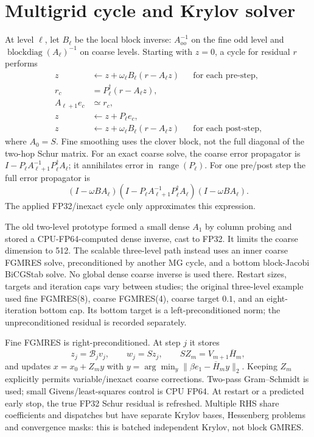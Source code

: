 \documentclass[11pt]{article}
\newcommand{\adj}{^{\dagger}}
\begin{document}
\section{Multigrid cycle and Krylov solver}
At level $\ell$, let $B_\ell$ be the local block inverse: $A_{oo}^{-1}$ on
the fine odd level and $\operatorname{blockdiag}(A_\ell)^{-1}$ on coarse levels.
Starting with $z=0$, a cycle for residual $r$ performs
\begin{align}
 z&\leftarrow z+\omega_\ell B_\ell(r-A_\ell z)
       &&\text{for each pre-step},\\
 r_c&=P_\ell\adj(r-A_\ell z),\\
 A_{\ell+1}e_c&\simeq r_c,\\
 z&\leftarrow z+P_\ell e_c,\\
 z&\leftarrow z+\omega_\ell B_\ell(r-A_\ell z)
       &&\text{for each post-step},
\end{align}
where $A_0=S$. Fine smoothing uses the clover block, not the full diagonal
of the two-hop Schur matrix. For an exact coarse solve, the coarse error
propagator is $I-P_\ell A_{\ell+1}^{-1}P_\ell\adj A_\ell$; it annihilates
error in $\operatorname{range}(P_\ell)$. For one pre/post step the full error
propagator is
\begin{equation}
 (I-\omega B A_\ell)
 (I-P_\ell A_{\ell+1}^{-1}P_\ell\adj A_\ell)
 (I-\omega B A_\ell).
\end{equation}
The applied FP32/inexact cycle only approximates this expression.

The old two-level prototype formed a small dense $A_1$ by column probing and
stored a CPU-FP64-computed dense inverse, cast to FP32. It limits the coarse
dimension to 512. The scalable three-level path instead uses an inner coarse
FGMRES solve, preconditioned by another MG cycle, and a bottom block-Jacobi
BiCGStab solve. No global dense coarse inverse is used there. Restart sizes,
targets and iteration caps vary between studies; the original three-level
example used fine FGMRES(8), coarse FGMRES(4), coarse target $0.1$, and an
eight-iteration bottom cap. Its bottom target is a left-preconditioned norm;
the unpreconditioned residual is recorded separately.

Fine FGMRES is right-preconditioned. At step $j$ it stores
\begin{equation}
 z_j=\mathcal B_jv_j,\qquad w_j=Sz_j,\qquad
 SZ_m=V_{m+1}\overline H_m,
\end{equation}
and updates $x=x_0+Z_my$ with
$y=\arg\min_y\|\beta e_1-\overline H_my\|_2$.
Keeping $Z_m$ explicitly permits variable/inexact coarse corrections.
Two-pass Gram--Schmidt is used; small Givens/least-squares control is CPU FP64.
At restart or a predicted early stop, the true FP32 Schur residual is refreshed.
Multiple RHS share coefficients and dispatches but have separate Krylov bases,
Hessenberg problems and convergence masks: this is batched independent Krylov,
not block GMRES.
\end{document}
